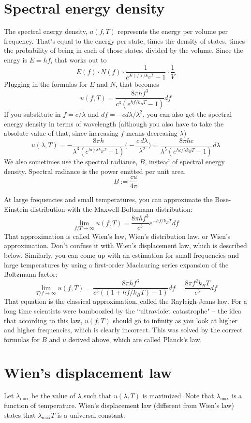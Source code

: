 \documentclass[12pt]{article}
\begin{document}
\section{Spectral energy density}
The spectral energy density, $u(f, T)$ represents the energy per volume per frequency. That's equal to the energy per state, times the density of states, times the probability of being in each of those states, divided by the volume. Since the enrgy is $E = hf$, that works out to
\[E(f) \cdot N(f) \cdot \frac{1}{e^{E(f)/k_B T} - 1} \cdot \frac{1}{V} \]
Plugging in the formulas for $E$ and $N$, that becomes
\[u(f, T) = \frac{8 \pi h f^3}{c^3 (e^{hf/k_B T} - 1)} df\]
If you substitute in $f = c / \lambda$ and $df = - c d\lambda / \lambda^2$, you can also get the spectral energy density in terms of wavelength (although you also have to take the absolute value of that, since increasing $f$ means decreasing $\lambda$)
\[ u(\lambda, T) = - \frac{8 \pi h}{\lambda^3 (e^{h c / \lambda k_B T} - 1)} \Bigg( - \frac{c \, d\lambda}{\lambda^2} \Bigg) = \frac{8 \pi h c}{\lambda^5 (e^{h c / \lambda k_B T} - 1)} d\lambda \]
We also sometimes use the spectral radiance, $B$, instead of spectral energy density. Spectral radiance is the power emitted per unit area.
\[ B := \frac{c u}{4 \pi} \]

At large frequencies and small temperatures, you can approximate the Bose-Einstein distribution with the Maxwell-Boltzmann distribution:
\[ \lim_{f/T \rightarrow \infty} u(f, T) = \frac{8 \pi h f^3}{c^3} e^{-hf/k_B T} df \]
That approximation is called Wien's law, Wien's distribution law, or Wien's approximation. Don't confuse it with Wien's displacement law, which is described below. Similarly, you can come up with an estimation for small frequencies and large temperatures by using a first-order Maclauring series expansion of the Boltzmann factor:
\[ \lim_{T/f \rightarrow \infty} u(f, T) = \frac{8 \pi h f^3}{c^3 ((1 + hf/k_B T) - 1)} df  = \frac{8 \pi f^2 k_B T}{c^3} df \]
That equation is the classical approximation, called the Rayleigh-Jeans law. For a long time scientists were bamboozled by the ``ultraviolet catastrophe" -- the idea that according to this law, $u(f, T)$ should go to infinity as you look at higher and higher frequencies, which is clearly incorrect. This was solved by the correct formulas for $B$ and $u$ derived above, which are called Planck's law.

\section{Wien's displacement law}
Let $\lambda_{\text{max}}$ be the value of $\lambda$ such that $u(\lambda, T)$ is maximized. Note that $\lambda_\text{max}$ is a function of temperature. Wien's displacement law (different from Wien's law) states that $\lambda_\text{max} T$ is a universal constant.
\end{document}
